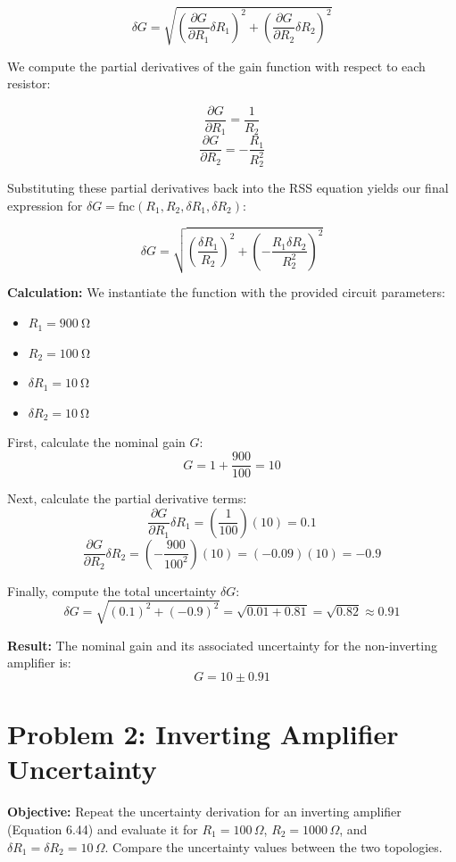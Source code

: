 \documentclass[11pt]{article}
\begin{document}
\[ \delta G = \sqrt{ \left( \frac{\partial G}{\partial R_1} \delta R_1 \right)^2 + \left( \frac{\partial G}{\partial R_2} \delta R_2 \right)^2 } \]

We compute the partial derivatives of the gain function with respect to each resistor:

\[ \frac{\partial G}{\partial R_1} = \frac{1}{R_2} \]
\[ \frac{\partial G}{\partial R_2} = -\frac{R_1}{R_2^2} \]

Substituting these partial derivatives back into the RSS equation yields our final expression for $\delta G = \text{fnc}(R_1, R_2, \delta R_1, \delta R_2)$:

\[ \delta G = \sqrt{ \left( \frac{\delta R_1}{R_2} \right)^2 + \left( -\frac{R_1 \delta R_2}{R_2^2} \right)^2 } \]

\textbf{Calculation:}
We instantiate the function with the provided circuit parameters:
\begin{itemize}
  \item $R_1 = \SI{900}{\ohm}$
  \item $R_2 = \SI{100}{\ohm}$
  \item $\delta R_1 = \SI{10}{\ohm}$
  \item $\delta R_2 = \SI{10}{\ohm}$
\end{itemize}

First, calculate the nominal gain $G$:
\[ G = 1 + \frac{900}{100} = 10 \]

Next, calculate the partial derivative terms:
\[ \frac{\partial G}{\partial R_1} \delta R_1 = \left(\frac{1}{100}\right)(10) = 0.1 \]
\[ \frac{\partial G}{\partial R_2} \delta R_2 = \left(-\frac{900}{100^2}\right)(10) = (-0.09)(10) = -0.9 \]

Finally, compute the total uncertainty $\delta G$:
\[ \delta G = \sqrt{ (0.1)^2 + (-0.9)^2 } = \sqrt{ 0.01 + 0.81 } = \sqrt{0.82} \approx 0.91 \]

\textbf{Result:}
The nominal gain and its associated uncertainty for the non-inverting amplifier is:
\[ G = 10 \pm 0.91 \]

\section*{Problem 2: Inverting Amplifier Uncertainty}

\textbf{Objective:} Repeat the uncertainty derivation for an inverting amplifier (Equation 6.44) and evaluate it for $R_1 = 100\,\Omega$, $R_2 = 1000\,\Omega$, and $\delta R_1 = \delta R_2 = 10\,\Omega$. Compare the uncertainty values between the two topologies.
\end{document}
